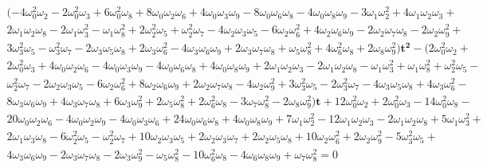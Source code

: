 \documentclass[a4paper,10pt]{amsart}
\theoremstyle{plain}
\theoremstyle{definition}
\theoremstyle{remark}
\numberwithin{equation}{section}
\begin{document}
    \begin{gather*}
(-4\omega_{0}^2\omega_{2} - 2\omega_{0}^2\omega_{3} + 6\omega_{0}^2\omega_{8} + 8\omega_{0}\omega_{2}\omega_{6} + 4\omega_{0}\omega_{3}\omega_{9}
    - 8\omega_{0}\omega_{6}\omega_{8} - 4\omega_{0}\omega_{8}\omega_{9} - 3\omega_{1}\omega_{2}^2 + 4\omega_{1}\omega_{2}\omega_{3} +\\
    2\omega_{1}\omega_{2}\omega_{8} - 
2\omega_{1}\omega_{3}^2 - \omega_{1}\omega_{8}^2 + 2\omega_{2}^2\omega_{5} + \omega_{2}^2\omega_{7} -
    4\omega_{2}\omega_{3}\omega_{5} - 6\omega_{2}\omega_{6}^2 + 4\omega_{2}\omega_{6}\omega_{9} - 2\omega_{2}\omega_{7}\omega_{8} -
    2\omega_{2}\omega_{9}^2 +\\ 3\omega_{3}^2\omega_{5} - \omega_{3}^2\omega_{7} -
2\omega_{3}\omega_{5}\omega_{8} + 2\omega_{3}\omega_{6}^2
    - 4\omega_{3}\omega_{6}\omega_{9} + 2\omega_{3}\omega_{7}\omega_{8} + \omega_{5}\omega_{8}^2 + 4\omega_{6}^2\omega_{8} +
    2\omega_{8}\omega_{9}^2)\pmb{t^2} - (2\omega_{0}^2\omega_{2} +\\ 2\omega_{0}^2\omega_{3} + 4\omega_{0}\omega_{2}\omega_{6} - 
4\omega_{0}\omega_{3}\omega_{9} -
    4\omega_{0}\omega_{6}\omega_{8} + 4\omega_{0}\omega_{8}\omega_{9} + 2\omega_{1}\omega_{2}\omega_{3} - 2\omega_{1}\omega_{2}\omega_{8} - \omega_{1}\omega_{3}^2 +
    \omega_{1}\omega_{8}^2 + \omega_{2}^2\omega_{5} -\\ \omega_{2}^2\omega_{7} - 2\omega_{2}\omega_{3}\omega_{5} - 6\omega_{2}\omega_{6}^2 +
    8\omega_{2}\omega_{6}\omega_{9} + 2\omega_{2}\omega_{7}\omega_{8} - 4\omega_{2}\omega_{9}^2 + 3\omega_{3}^2\omega_{5} - 2\omega_{3}^2\omega_{7} -
    4\omega_{3}\omega_{5}\omega_{8} + 4\omega_{3}\omega_{6}^2 -\\ 8\omega_{3}\omega_{6}\omega_{9} + 4\omega_{3}\omega_{7}\omega_{8} + 6\omega_{3}\omega_{9}^2 +
    2\omega_{5}\omega_{8}^2 + 2\omega_{6}^2\omega_{8} - 3\omega_{7}\omega_{8}^2 - 2\omega_{8}\omega_{9}^2)\pmb{t} + 12\omega_{0}^2\omega_{2} +
    2\omega_{0}^2\omega_{3} - 14\omega_{0}^2\omega_{8} -\\ 20\omega_{0}\omega_{2}\omega_{6} - 4\omega_{0}\omega_{2}\omega_{9} - 4\omega_{0}\omega_{3}\omega_{6} + 24\omega_{0}\omega_{6}\omega_{8}
    + 4\omega_{0}\omega_{8}\omega_{9} + 7\omega_{1}\omega_{2}^2 - 12\omega_{1}\omega_{2}\omega_{3} - 2\omega_{1}\omega_{2}\omega_{8} + 5\omega_{1}\omega_{3}^2 + \\2\omega_{1}\omega_{3}\omega_{8}
    - 6\omega_{2}^2\omega_{5} - \omega_{2}^2\omega_{7} + 10\omega_{2}\omega_{3}\omega_{5} + 
2\omega_{2}\omega_{3}\omega_{7} + 2\omega_{2}\omega_{5}\omega_{8} + 10\omega_{2}\omega_{6}^2 +
    2\omega_{2}\omega_{9}^2 - 5\omega_{3}^2\omega_{5} +\\ 4\omega_{3}\omega_{6}\omega_{9} - 2\omega_{3}\omega_{7}\omega_{8} - 2\omega_{3}\omega_{9}^2 - \omega_{5}\omega_{8}^2 -
    10\omega_{6}^2\omega_{8} -
 4\omega_{6}\omega_{8}\omega_{9} + \omega_{7}\omega_{8}^2=0
 \end{gather*}
\end{document}
